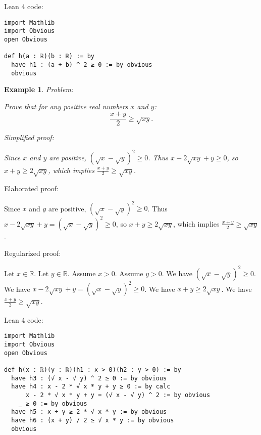 \documentclass{article}
\newtheorem{example}{Example}
\begin{document}
Lean 4 code:
\begin{tcolorbox}[colback=white!10, width=\linewidth]
\begin{lstlisting}[language=Lean4]
import Mathlib
import Obvious
open Obvious

def h(a : ℝ)(b : ℝ) := by
  have h1 : (a + b) ^ 2 ≥ 0 := by obvious
  obvious

\end{lstlisting}
\end{tcolorbox}


\begin{example}
Problem:
\begin{tcolorbox}[colback=yellow!10, width=\linewidth]
Prove that for any positive real numbers $x$ and $y$:
    $$\frac{x+y}{2} \geq \sqrt{xy}.$$
\end{tcolorbox}

Simplified proof:
\begin{tcolorbox}[colback=blue!10, width=\linewidth]
Since $x$ and $y$ are positive, $(\sqrt{x} - \sqrt{y})^2 \ge 0$. Thus $x - 2\sqrt{xy} + y \ge 0$, so $x+y \ge 2\sqrt{xy}$, which implies $\frac{x+y}{2} \ge \sqrt{xy}$.
\end{tcolorbox}
\end{example}

Elaborated proof:
\begin{tcolorbox}[colback=green!10, width=\linewidth]
Since $x$ and $y$ are positive, $(\sqrt{x} - \sqrt{y})^2 \ge 0$. Thus $x - 2\sqrt{xy} + y = (\sqrt{x} - \sqrt{y})^2 \ge 0$, so $x+y \ge 2\sqrt{xy}$, which implies $\frac{x+y}{2} \ge \sqrt{xy}$.
\end{tcolorbox}

Regularized proof:
\begin{tcolorbox}[colback=red!10, width=\linewidth]
Let $x\in\mathbb{R}$.
Let $y\in\mathbb{R}$.
Assume $x > 0$.
Assume $y > 0$.
We have ${(\sqrt{x} - \sqrt{y})}^2 \ge 0$.
We have $x - 2\sqrt{xy} + y = {(\sqrt{x} - \sqrt{y})}^2 \ge 0$.
We have $x+y \ge 2\sqrt{xy}$.
We have $\frac{x+y}{2} \ge \sqrt{xy}$.
\end{tcolorbox}

Lean 4 code:
\begin{tcolorbox}[colback=white!10, width=\linewidth]
\begin{lstlisting}[language=Lean4]
import Mathlib
import Obvious
open Obvious

def h(x : ℝ)(y : ℝ)(h1 : x > 0)(h2 : y > 0) := by
  have h3 : (√ x - √ y) ^ 2 ≥ 0 := by obvious
  have h4 : x - 2 * √ x * y + y ≥ 0 := by calc
      x - 2 * √ x * y + y = (√ x - √ y) ^ 2 := by obvious
    _ ≥ 0 := by obvious
  have h5 : x + y ≥ 2 * √ x * y := by obvious
  have h6 : (x + y) / 2 ≥ √ x * y := by obvious
  obvious

\end{lstlisting}
\end{tcolorbox}
\end{document}
